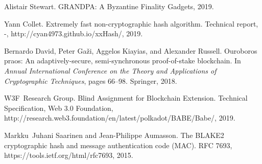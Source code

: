 \documentclass{article}
\newcommand{\tmtextit}[1]{{\itshape{#1}}}
\providecommand{\tmtextit}[1]{\tmtextit{#1}}
\begin{document}
\begin{thebibliography}{DGKR18}
  Alistair Stewart.
  {\newblock}GRANDPA: A Byzantine Finality Gadgets, 2019.
  
  Yann Collet. {\newblock}Extremely fast
  non-cryptographic hash algorithm. {\newblock}Technical report, -,
  http://cyan4973.github.io/xxHash/, 2019.
  
  Bernardo David, Peter Ga{\v z}i,
  Aggelos Kiayias, and Alexander Russell. {\newblock}Ouroboros praos: An
  adaptively-secure, semi-synchronous proof-of-stake blockchain. {\newblock}In
  \tmtextit{Annual International Conference on the Theory and Applications of
  Cryptographic Techniques}, pages 66--98. Springer, 2018.
  
  W3F~Research Group.
  {\newblock}Blind Assignment for Blockchain Extension. {\newblock}Technical
  Specification, Web 3.0 Foundation,
  http://research.web3.foundation/en/latest/polkadot/BABE/Babe/, 2019.
  
  Markku~Juhani Saarinen and Jean-Philippe
  Aumasson. {\newblock}The BLAKE2 cryptographic hash and message
  authentication code (MAC). {\newblock}RFC 7693,
  https://tools.ietf.org/html/rfc7693, 2015.
\end{thebibliography}
\end{document}
